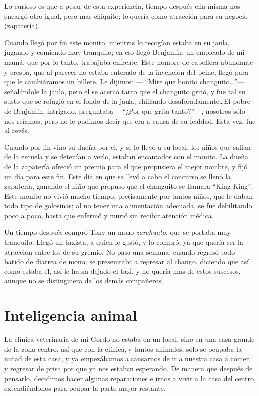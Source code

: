 \documentclass[letterpaper, 12pt]{book}
\begin{document}
Lo curioso es que a pesar de esta experiencia, tiempo después ella misma nos encargó otro igual, pero mas chiquito; lo quería como atracción para su negocio (zapatería).

Cuando llegó por fin este monito, mientras lo recogían estaba en su jaula, jugando y comiendo muy tranquilo; en eso llegó Benjamín, un empleado de mi mamá, que por lo tanto, trabajaba enfrente. Este hombre de cabellera abundante y crespa, que al parecer no estaba enterado de la invención del peine, llegó para que le cambiáramos un billete. Le dijimos: --- ``Mire que bonito changuito\ldots''--- señalándole la jaula, pero el se acercó tanto que el changuito gritó, y fue tal su susto que se refugió en el fondo de la jaula, chillando desaforadamente\ldots El pobre de Benjamín, intrigado, preguntaba ---``¿Por que grita tanto?''---, nosotros sólo nos reíamos, pero no le pudimos decir que era a causa de su fealdad. Esta vez, fue al revés.

Cuando por fin vino su dueña por el, y se lo llevó a su local, los niños que salían de la escuela y se detenían a verlo, estaban encantados con el monito. La dueña de la zapatería ofreció un premio para el que propusiera el mejor nombre, y fijó un día para este fin.
Este día en que se llevó a cabo el concurso se llenó la zapatería, ganando el niño que propuso que el changuito se llamara ``King-King''.  Este monito no vivió mucho tiempo, precisamente por tantos niños, que le daban todo tipo de golosinas; al no tener una alimentación adecuada, se fue debilitando poco a poco, hasta que enfermó y murió sin recibir atención médica.

Un tiempo después compró Tony un mono \textit{zarahuato}, que se portaba muy tranquilo. Llegó un taxista, a quien le gustó, y lo compró, ya que quería ser la atracción entre los de su gremio. No pasó una semana, cuando regresó todo batido de diarrea de mono; se presemtaba a  regresar al chango, diciendo que así como estaba él, así le había dejado el taxi, y no quería mas de estos suscesos, aunque no se distinguiera de los demás compañeros.
\chapter{Inteligencia animal}
La clínica veterinaria de mi Gordo no estaba en un local, sino en una casa grande de la zona centro, así que con la clínica, y tantos animales, sólo se ocupaba la mitad de esta casa, y ya empezábamos a cansarnos de ir a nuestra casa a comer, y regresar de prisa por que ya nos estaban esperando.
De manera que después de pensarlo, decidimos hacer algunas reparaciones e irnos a vivir a la casa del centro, extendiéndonos para ocupar la parte mayor restante.
\end{document}
